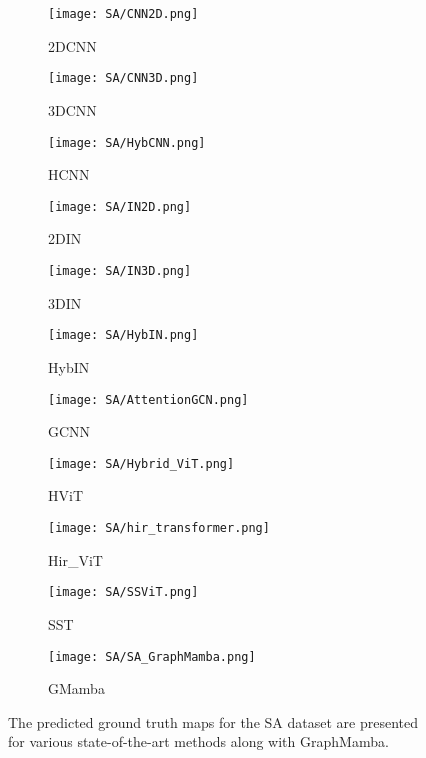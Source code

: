\documentclass[journal]{IEEEtran}
\begin{document}
\begin{figure*}[!htb]
    \centering
        \begin{subfigure}{0.085\textwidth}
            \texttt{[image: SA/CNN2D.png]}
            \caption{2DCNN}
        \end{subfigure}
        \begin{subfigure}{0.085\textwidth}
            \centering
            \texttt{[image: SA/CNN3D.png]}
            \caption{3DCNN}
        \end{subfigure}
        \begin{subfigure}{0.085\textwidth}
            \centering
            \texttt{[image: SA/HybCNN.png]}
            \caption{HCNN}
        \end{subfigure}
        \begin{subfigure}{0.085\textwidth}
            \centering
            \texttt{[image: SA/IN2D.png]}
            \caption{2DIN}
        \end{subfigure}
        \begin{subfigure}{0.085\textwidth}
            \centering
            \texttt{[image: SA/IN3D.png]}
            \caption{3DIN}
        \end{subfigure}
        \begin{subfigure}{0.085\textwidth}
            \centering
            \texttt{[image: SA/HybIN.png]}
            \caption{HybIN}
        \end{subfigure}
        \begin{subfigure}{0.085\textwidth}
            \centering
            \texttt{[image: SA/AttentionGCN.png]}
            \caption{GCNN}
        \end{subfigure}
        \begin{subfigure}{0.085\textwidth}
            \centering
            \texttt{[image: SA/Hybrid\_ViT.png]}
            \caption{HViT}
        \end{subfigure}
        \begin{subfigure}{0.085\textwidth}
            \centering
            \texttt{[image: SA/hir\_transformer.png]}
            \caption{Hir\_ViT}
        \end{subfigure}
        \begin{subfigure}{0.085\textwidth}
            \centering
            \texttt{[image: SA/SSViT.png]}
            \caption{SST}
        \end{subfigure}
        \begin{subfigure}{0.085\textwidth}
            \centering
            \texttt{[image: SA/SA\_GraphMamba.png]}
            \caption{GMamba}
        \end{subfigure}
    \caption{The predicted ground truth maps for the SA dataset are presented for various state-of-the-art methods along with GraphMamba.}
    \label{fig:SA_results}
\end{figure*}
\end{document}
